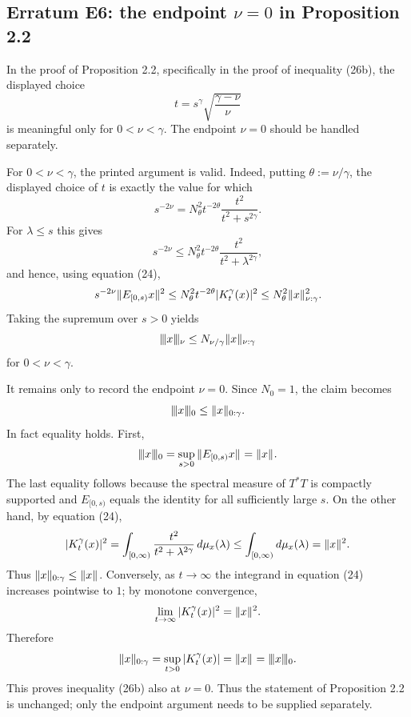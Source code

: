 
\subsection*{Erratum E6: the endpoint $\nu=0$ in Proposition 2.2}
\label{s:erratum:E6}

In the proof of Proposition 2.2, specifically in the proof of
inequality (26b), the displayed choice
\[
        t=s^\gamma\sqrt{\frac{\gamma-\nu}{\nu}}
\]
is meaningful only for $0<\nu<\gamma$.  The endpoint $\nu=0$ should be
handled separately.

For $0<\nu<\gamma$, the printed argument is valid.  Indeed, putting
$\theta:=\nu/\gamma$, the displayed choice of $t$ is exactly the value
for which
\[
        s^{-2\nu}
        =
        N_{\theta}^{2}t^{-2\theta}
        \frac{t^2}{t^2+s^{2\gamma}} .
\]
For $\lambda\leq s$ this gives
\[
        s^{-2\nu}
        \leq
        N_{\theta}^{2}t^{-2\theta}
        \frac{t^2}{t^2+\lambda^{2\gamma}},
\]
and hence, using equation (24),
\[
        s^{-2\nu}\| E_{[0,s)}x \|_{  }^2
        \leq
        N_{\theta}^{2}t^{-2\theta}|K_t^\gamma(x)|^2
        \leq
        N_{\theta}^{2}\| x \|_{ \nu:\gamma }^{2} .
\]
Taking the supremum over $s>0$ yields
\[
        \vert\kern-0.25ex\vert\kern-0.25ex\vert x \vert\kern-0.25ex \vert\kern-0.25ex\vert_{ \nu }
        \leq
        N_{\nu/\gamma}\| x \|_{ \nu:\gamma }
\]
for $0<\nu<\gamma$.

It remains only to record the endpoint $\nu=0$.  Since $N_0=1$, the
claim becomes
\[
        \vert\kern-0.25ex\vert\kern-0.25ex\vert x \vert\kern-0.25ex \vert\kern-0.25ex\vert_{ 0 }\leq\| x \|_{ 0:\gamma }.
\]
In fact equality holds.  First,
\[
        \vert\kern-0.25ex\vert\kern-0.25ex\vert x \vert\kern-0.25ex \vert\kern-0.25ex\vert_{ 0 }
        =
        \sup_{s>0}\| E_{[0,s)}x \|_{  }
        =
        \| x \|_{  }.
\]
The last equality follows because the spectral measure of $T^*T$ is
compactly supported and $E_{[0,s)}$ equals the identity for all sufficiently
large $s$.  On the other hand, by equation (24),
\[
        |K_t^\gamma(x)|^2
        =
        \int_{[0,\infty)}
        \frac{t^2}{t^2+\lambda^{2\gamma}}\,d\mu_x(\lambda)
        \leq
        \int_{[0,\infty)}d\mu_x(\lambda)
        =
        \| x \|_{  }^2 .
\]
Thus $\| x \|_{ 0:\gamma }\leq\| x \|_{  }$.  Conversely, as
$t\to\infty$ the integrand in equation (24) increases pointwise to $1$;
by monotone convergence,
\[
        \lim_{t\to\infty}|K_t^\gamma(x)|^2
        =
        \| x \|_{  }^2 .
\]
Therefore
\[
        \| x \|_{ 0:\gamma }
        =
        \sup_{t>0}|K_t^\gamma(x)|
        =
        \| x \|_{  }
        =
        \vert\kern-0.25ex\vert\kern-0.25ex\vert x \vert\kern-0.25ex \vert\kern-0.25ex\vert_{ 0 }.
\]
This proves inequality (26b) also at $\nu=0$.  Thus the statement of
Proposition 2.2 is unchanged; only the endpoint argument needs
to be supplied separately.
